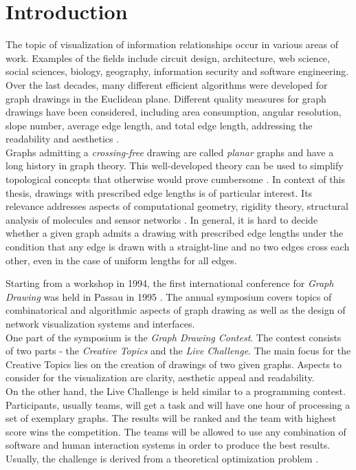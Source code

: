\section{Introduction}

The topic of visualization of information relationships occur in various areas of work. Examples of the fields include circuit design, architecture, web science, social sciences, biology, geography, information security and software engineering.
Over the last decades, many different efficient algorithms were developed for graph drawings in the Euclidean plane. Different quality measures for graph drawings have been considered, including area consumption, angular resolution, slope number, average edge length, and total edge length, addressing the readability and aesthetics \cite{edge-length-ratio-2tree}.\\
Graphs admitting a \emph{crossing-free} drawing are called \emph{planar} graphs and have a long history in graph theory. This well-developed theory can be used to simplify topological concepts that otherwise would prove cumbersome \cite[P. 9]{battista_1999}.
\bigskip
In context of this thesis, drawings with prescribed edge lengths is of particular interest. Its relevance addresses aspects of computational geometry, rigidity theory, structural analysis of molecules and sensor networks \cite[P. 1]{straight-line_2-trees}. In general, it is hard to decide \cite[P. 2]{straight-line_2-trees} whether a given graph admits a drawing with prescribed edge lengths under the condition that any edge is drawn with a straight-line and no two edges cross each other, even in the case of uniform lengths for all edges.

\bigskip


Starting from a workshop in 1994, the first international conference for \emph{Graph Drawing} was held in Passau in 1995 \cite{GD:Symposium}. The annual symposium covers topics of combinatorical and algorithmic aspects of graph drawing as well as the design of network visualization systems and interfaces.\\
One part of the symposium is the \emph{Graph Drawing Contest}. The contest consists of two parts - the \emph{Creative Topics} and the \emph{Live Challenge}. The main focus for the Creative Topics lies on the creation of drawings of two given graphs. Aspects to consider for the visualization are clarity, aesthetic appeal and readability.\\
On the other hand, the Live Challenge is held similar to a programming contest. Participants, usually teams, will get a task and will have one hour of processing a set of exemplary graphs. The results will be ranked and the team with highest score wins the competition. The teams will be allowed to use any combination of software and human interaction systems in order to produce the best results. Usually, the challenge is derived from a theoretical optimization problem \cite{GD:2021}.

